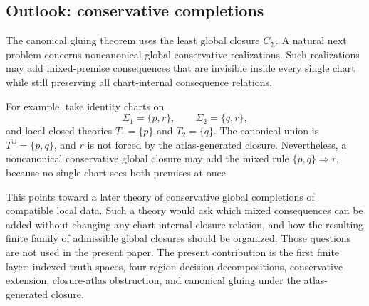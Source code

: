 \documentclass[11pt]{amsart}
\numberwithin{equation}{section}
\theoremstyle{plain}
\theoremstyle{definition}
\theoremstyle{remark}
\newcommand{\Sig}{\Sigma}
\newcommand{\CA}{C_{\mathfrak A}}
\newcommand{\Tcup}{T^{\cup}}
\begin{document}
\subsection*{Outlook: conservative completions}

The canonical gluing theorem uses the least global closure \(\CA\).  A natural next problem concerns noncanonical global conservative realizations.  Such realizations may add mixed-premise consequences that are invisible inside every single chart while still preserving all chart-internal consequence relations.

For example, take identity charts on
\[
  \Sig_1=\{p,r\},
  \qquad
  \Sig_2=\{q,r\},
\]
and local closed theories \(T_1=\{p\}\) and \(T_2=\{q\}\).  The canonical union is \(\Tcup=\{p,q\}\), and \(r\) is not forced by the atlas-generated closure.  Nevertheless, a noncanonical conservative global closure may add the mixed rule \(\{p,q\}\Rightarrow r\), because no single chart sees both premises at once.

This points toward a later theory of conservative global completions of compatible local data.  Such a theory would ask which mixed consequences can be added without changing any chart-internal closure relation, and how the resulting finite family of admissible global closures should be organized.  Those questions are not used in the present paper.  The present contribution is the first finite layer: indexed truth spaces, four-region decision decompositions, conservative extension, closure-atlas obstruction, and canonical gluing under the atlas-generated closure.




\end{document}
